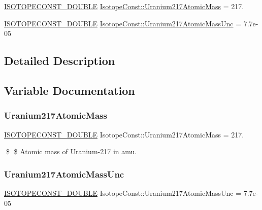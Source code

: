 \begin{DoxyCompactItemize}
\item 
\mbox{\hyperlink{group___isotope_const-_macros_ga8f45a7272ce02c0b4c65c44636ed719a}{I\+S\+O\+T\+O\+P\+E\+C\+O\+N\+S\+T\+\_\+\+D\+O\+U\+B\+LE}} \mbox{\hyperlink{group___isotope_const-_uranium-_u217_gaa941f564bcdd3ada0169c03cd39b2eef}{Isotope\+Const\+::\+Uranium217\+Atomic\+Mass}} = 217.
\item 
\mbox{\hyperlink{group___isotope_const-_macros_ga8f45a7272ce02c0b4c65c44636ed719a}{I\+S\+O\+T\+O\+P\+E\+C\+O\+N\+S\+T\+\_\+\+D\+O\+U\+B\+LE}} \mbox{\hyperlink{group___isotope_const-_uranium-_u217_ga021c718dac67c01ffdcd4d9b993f5c84}{Isotope\+Const\+::\+Uranium217\+Atomic\+Mass\+Unc}} = 7.\+7e-\/05
\end{DoxyCompactItemize}


\subsection{Detailed Description}


\subsection{Variable Documentation}
\mbox{\label{group___isotope_const-_uranium-_u217_gaa941f564bcdd3ada0169c03cd39b2eef}} 
\subsubsection{\texorpdfstring{Uranium217\+Atomic\+Mass}{Uranium217AtomicMass}}
{\footnotesize\ttfamily \mbox{\hyperlink{group___isotope_const-_macros_ga8f45a7272ce02c0b4c65c44636ed719a}{I\+S\+O\+T\+O\+P\+E\+C\+O\+N\+S\+T\+\_\+\+D\+O\+U\+B\+LE}} Isotope\+Const\+::\+Uranium217\+Atomic\+Mass = 217.}

\$ \$ Atomic mass of Uranium-\/217 in amu. \mbox{\label{group___isotope_const-_uranium-_u217_ga021c718dac67c01ffdcd4d9b993f5c84}} 
\subsubsection{\texorpdfstring{Uranium217\+Atomic\+Mass\+Unc}{Uranium217AtomicMassUnc}}
{\footnotesize\ttfamily \mbox{\hyperlink{group___isotope_const-_macros_ga8f45a7272ce02c0b4c65c44636ed719a}{I\+S\+O\+T\+O\+P\+E\+C\+O\+N\+S\+T\+\_\+\+D\+O\+U\+B\+LE}} Isotope\+Const\+::\+Uranium217\+Atomic\+Mass\+Unc = 7.\+7e-\/05}

